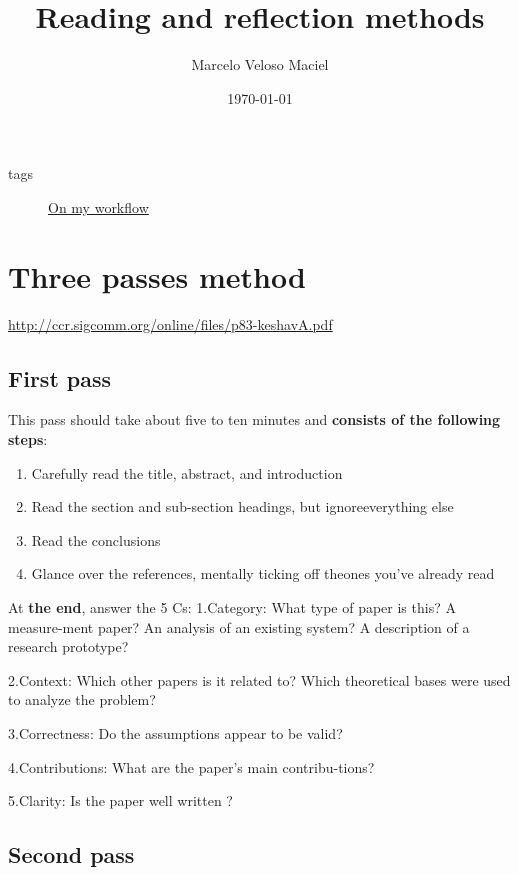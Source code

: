 \documentclass[11pt]{article}
\author{Marcelo Veloso Maciel}
\date{\today}
\title{Reading and reflection methods}
\begin{document}
\maketitle
\tableofcontents

\begin{description}
\item[{tags}] \href{20200525200536-on\_my\_workflow.org}{On my workflow}
\end{description}


\section{Three passes method}
\label{sec:orgfb3f8ab}
\url{http://ccr.sigcomm.org/online/files/p83-keshavA.pdf}

\subsection{First pass}
\label{sec:org304a619}

This pass should take about five to ten minutes and \textbf{consists of the following steps}:

\begin{enumerate}
\item Carefully read the title, abstract, and introduction
\item Read the section and sub-section headings, but ignoreeverything else
\item Read the conclusions
\item Glance over the references, mentally ticking off theones you’ve already read
\end{enumerate}

At \textbf{the end}, answer the 5 Cs:
1.Category: What type of paper is this?  A measure-ment paper?  An analysis of an existing system?  A description of a research prototype?

2.Context: Which other papers is it related to? Which theoretical bases were used to analyze the problem?

3.Correctness: Do the assumptions appear to be valid?

4.Contributions: What are the paper’s main contribu-tions?

5.Clarity: Is the paper well written ?

\subsection{Second pass}
\label{sec:orge8b303a}
\end{document}
